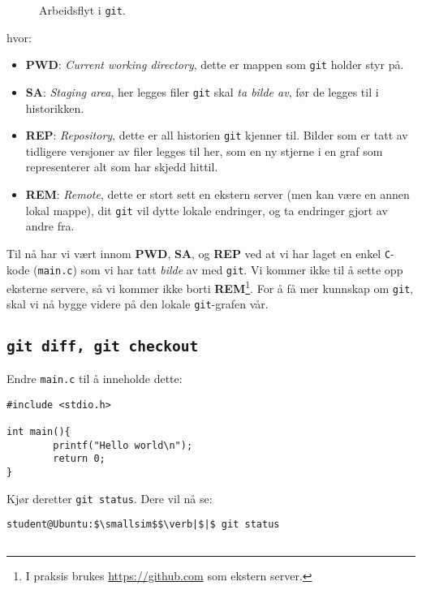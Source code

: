 \begin{alphasection}
\begin{figure}[ht]
\begin{tikzpicture}[x=0.75pt,y=0.75pt,yscale=-1.1,xscale=1.1]
\end{tikzpicture}
    \caption{Arbeidsflyt i \texttt{git}.}
    \label{fig:2-oppgaveish}
\end{figure}
\newpage
hvor:

\begin{itemize}
    \item \textbf{PWD}: \textit{Current working directory}, dette er mappen som \verb|git| holder styr på.
    \item \textbf{SA}: \textit{Staging area}, her legges filer \verb|git| skal \textit{ta bilde av}, før de legges til i historikken.
    \item \textbf{REP}: \textit{Repository}, dette er all historien \verb|git| kjenner til. Bilder som er tatt av tidligere versjoner av filer legges til her, som en ny stjerne i en graf
    som representerer alt som har skjedd hittil.
    
    \item \textbf{REM}: \textit{Remote}, dette er stort sett en ekstern server (men kan være en annen
    lokal mappe), dit \verb|git| vil dytte lokale endringer, og ta endringer gjort
    av andre fra. 
\end{itemize}



Til nå har vi vært innom \textbf{PWD}, \textbf{SA}, og \textbf{REP} ved at vi har laget en enkel \verb|C|-kode (\verb|main.c|) som vi har tatt \textit{bilde} av med \verb|git|. Vi kommer ikke til å sette opp eksterne servere, så vi kommer ikke borti \textbf{REM}\footnote{I praksis brukes \href{https://github.com}{https://github.com} som ekstern server.}. For å få mer kunnskap om \verb|git|, skal vi nå bygge videre på den lokale \verb|git|-grafen vår.

\subsection{\texttt{git diff, git checkout}}

Endre \verb|main.c| til å inneholde dette:

\begin{lstlisting}
#include <stdio.h>

int main(){
        printf("Hello world\n");
        return 0;
}
\end{lstlisting}

Kjør deretter \verb|git status|. Dere vil nå se:

\begin{lstlisting}[mathescape=true]
student@Ubuntu:$\smallsim$$\verb|$|$ git status


\end{lstlisting}
\end{alphasection}
